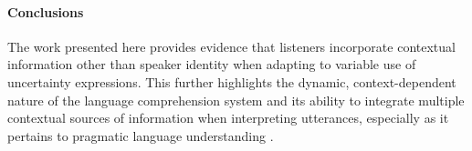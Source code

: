 \documentclass[man,floatsintext]{apa6}
\begin{document}
\paragraph{Conclusions}

The work presented here provides evidence that listeners incorporate contextual information other than speaker identity when adapting to variable use of uncertainty expressions. This further highlights the dynamic, context-dependent nature of the language comprehension system and its ability to integrate multiple contextual sources of information when interpreting utterances, especially as it pertains to pragmatic language understanding \cite{DegenTanenhaus2019}.



\setlength{\bibleftmargin}{.125in}
\setlength{\bibindent}{-\bibleftmargin}


\end{document}
